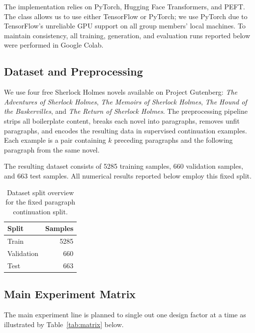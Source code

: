 \documentclass{article}
\newcommand{\traincount}{5285}
\newcommand{\valcount}{660}
\newcommand{\testcount}{663}
\begin{document}
The implementation relies on PyTorch, Hugging Face Transformers, and PEFT. The class allows us to use either TensorFlow or PyTorch; we use PyTorch due to TensorFlow's unreliable GPU support on all group members' local machines. To maintain consistency, all training, generation, and evaluation runs reported below were performed in Google Colab.

\subsection{Dataset and Preprocessing}

We use four free Sherlock Holmes novels available on Project Gutenberg: \textit{The Adventures of Sherlock Holmes}, \textit{The Memoirs of Sherlock Holmes}, \textit{The Hound of the Baskervilles}, and \textit{The Return of Sherlock Holmes}. The preprocessing pipeline strips all boilerplate content, breaks each novel into paragraphs, removes unfit paragraphs, and encodes the resulting data in supervised continuation examples. Each example is a pair containing $k$ preceding paragraphs and the following paragraph from the same novel.

The resulting dataset consists of \traincount{} training samples, \valcount{} validation samples, and \testcount{} test samples. All numerical results reported below employ this fixed split.

\begin{table}[t]
\caption{Dataset split overview for the fixed paragraph continuation split.}
\label{tab:dataset}
\centering
\begin{tabular}{lr}
\toprule
Split & Samples \\
\midrule
Train & \traincount \\
Validation & \valcount \\
Test & \testcount \\
\bottomrule
\end{tabular}
\end{table}

\subsection{Main Experiment Matrix}

The main experiment line is planned to single out one design factor at a time as illustrated by Table~\ref{tab:matrix} below.
\end{document}
